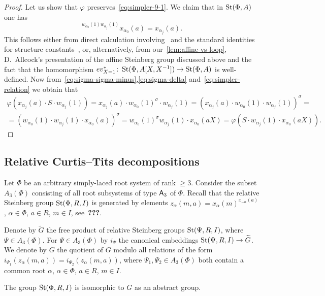 \begin{proof}
 Let us show that $\varphi$ preserves~\eqref{eq:simpler-9-1}.
 We claim that in $\operatorname{St}(\Phi, A)$ one has
 \begin{equation} \label{eq:simpler-relation} {}^{w_{\alpha_0}(1) w_{\alpha_j}(1)} x_{\alpha_0}(a) = x_{\alpha_j}(a). \end{equation}
 This follows either from direct calculation involving~\cite[Lemma~5.1]{Ma69} and the standard identities for structure constants~\cite[\S~14]{VP},
 or, alternatively, from our~\cref{lem:affine-vs-loop}, D.~Allcock's presentation of the affine Steinberg group discussed above and
 the fact that the homomorphism $ev_{X=1}^*\colon \operatorname{St}(\Phi, A[X, X^{-1}]) \to \operatorname{St}(\Phi, A)$ is well-defined.
 Now from~\eqref{eq:sigma-sigma-minus},\eqref{eq:sigma-delta} and~\eqref{eq:simpler-relation} we obtain that
 \begin{multline*}
     \varphi(x_{\alpha_j}(a) \cdot S \cdot w_{\alpha_j}(1)) = x_{\alpha_j}(a) \cdot w_{\alpha_0}(1)^\sigma \cdot w_{\alpha_j}(1) = \left(x_{\alpha_j}(a) \cdot w_{\alpha_0}(1) \cdot w_{\alpha_j}(1)\right)^\sigma = \\
     = \left(w_{\alpha_0}(1) \cdot w_{\alpha_j}(1) \cdot x_{\alpha_0}(a)\right)^\sigma = w_{\alpha_0}(1)^\sigma w_{\alpha_j}(1) \cdot x_{\alpha_0}(aX) = \varphi(S \cdot w_{\alpha_j}(1) \cdot x_{\alpha_0}(aX)).
 \end{multline*}
\end{proof}

\subsection{Relative Curtis--Tits decompositions}
Let $\Phi$ be an arbitrary simply-laced root system of rank $\geq 3$.
Consider the subset $A_3(\Phi)$ consisting of all root subsystems of type $\mathsf{A}_3$ of $\Phi$.
Recall that the relative Steinberg group $\operatorname{St}(\Phi, R, I)$ is generated by elements
$z_\alpha(m, a) = x_\alpha(m)^{x_{-\alpha}(a)}$, $\alpha \in \Phi$, $a \in R$, $m \in I$, see~\textbf{???}.

Denote by $\widetilde{G}$ the free product of relative Steinberg groups $\operatorname{St}(\Psi, R, I)$, where $\Psi \in A_3(\Phi)$.
For $\Psi \in A_3(\Phi)$ by $i_\Psi$ the canonical embeddings $\operatorname{St}(\Psi, R, I) \to \widetilde{G}$.
We denote by $G$ the quotient of $G$ modulo all relations of the form $i_{\Psi_1}(z_\alpha(m, a)) = i_{\Psi_2}(z_\alpha(m, a))$,
where $\Psi_1, \Psi_2 \in A_3(\Phi)$ both contain a common root $\alpha$, $\alpha \in \Phi$, $a\in R$, $m \in I$.

\begin{thm}\label{thm:relPres} The group $\operatorname{St}(\Phi, R, I)$ is isomorphic to $G$ as an abstract group. \end{thm}
